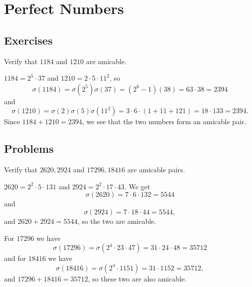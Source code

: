 \chapter{Perfect Numbers}

\section{Exercises}

 Verify that $1184$ and $1210$ are amicable.
\begin{solution}
  $1184 = 2^5\cdot37$ and $1210 = 2\cdot5\cdot11^2$, so
  \begin{equation*}
    \sigma(1184) = \sigma(2^5)\sigma(37)
    = (2^6 - 1)(38) = 63\cdot38 = 2394
  \end{equation*}
  and
  \begin{equation*}
    \sigma(1210) = \sigma(2)\sigma(5)\sigma(11^2)
    = 3\cdot6\cdot(1 + 11 + 121) = 18\cdot133
    = 2394.
  \end{equation*}
  Since $1184 + 1210 = 2394$, we see that the two numbers form an
  amicable pair.
\end{solution}

\section{Problems}

 Verify that $2620, 2924$ and $17296,18416$ are amicable pairs.
\begin{solution}
  $2620 = 2^2\cdot5\cdot131$ and $2924 = 2^2\cdot17\cdot43$. We get
  \begin{equation*}
    \sigma(2620) = 7\cdot6\cdot132 = 5544
  \end{equation*}
  and
  \begin{equation*}
    \sigma(2924) = 7\cdot18\cdot44 = 5544,
  \end{equation*}
  and $2620 + 2924 = 5544$, so the two are amicable.

  For $17296$ we have
  \begin{equation*}
    \sigma(17296) = \sigma(2^4\cdot23\cdot47)
    = 31\cdot24\cdot48 = 35712
  \end{equation*}
  and for $18416$ we have
  \begin{equation*}
    \sigma(18416) = \sigma(2^4\cdot1151)
    = 31\cdot1152 = 35712,
  \end{equation*}
  and $17296 + 18416 = 35712$, so these two are also amicable.
\end{solution}

